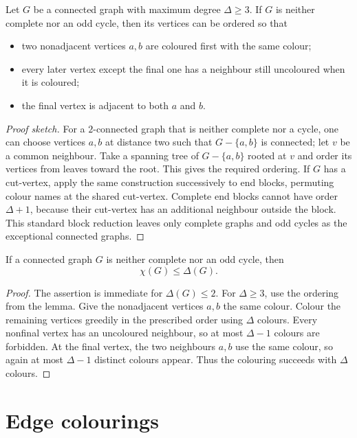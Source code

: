 \begin{notelemma}
Let $G$ be a connected graph with maximum degree $\Delta\ge3$.  If $G$ is
neither complete nor an odd cycle, then its vertices can be ordered so that
\begin{itemize}
  \item two nonadjacent vertices $a,b$ are coloured first with the same
        colour;
  \item every later vertex except the final one has a neighbour still
        uncoloured when it is coloured;
  \item the final vertex is adjacent to both $a$ and $b$.
\end{itemize}
\end{notelemma}
\begin{proof}[Proof sketch]
For a $2$-connected graph that is neither complete nor a cycle, one can choose
vertices $a,b$ at distance two such that $G-\{a,b\}$ is connected; let $v$ be
a common neighbour.  Take a spanning tree of $G-\{a,b\}$ rooted at $v$ and
order its vertices from leaves toward the root.  This gives the required
ordering.  If $G$ has a cut-vertex, apply the same construction successively
to end blocks, permuting colour names at the shared cut-vertex.  Complete end
blocks cannot have order $\Delta+1$, because their cut-vertex has an
additional neighbour outside the block.  This standard block reduction leaves
only complete graphs and odd cycles as the exceptional connected graphs.
\end{proof}

\begin{notetheorem}
If a connected graph $G$ is neither complete nor an odd cycle, then
\[
  \chi(G)\le\Delta(G).
\]
\end{notetheorem}
\begin{proof}
The assertion is immediate for $\Delta(G)\le2$.  For $\Delta\ge3$, use the
ordering from the lemma.  Give the nonadjacent vertices $a,b$ the same colour.
Colour the remaining vertices greedily in the prescribed order using
$\Delta$ colours.  Every nonfinal vertex has an uncoloured neighbour, so at
most $\Delta-1$ colours are forbidden.  At the final vertex, the two
neighbours $a,b$ use the same colour, so again at most $\Delta-1$ distinct
colours appear.  Thus the colouring succeeds with $\Delta$ colours.
\end{proof}
\section{Edge colourings}

